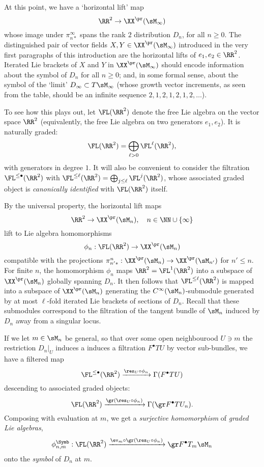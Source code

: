 \subsection{}
At this point, we have a `horizontal lift' map \[\RR^2 \to \XX^{\pr}(\sM_\infty)\]
whose image under $\pi^\infty_{n*}$ spans the rank $2$ distribution $D_n$,
for all $n \ge 0$. The distinguished pair of vector fields
$X, Y \in \XX^{\pr}(\sM_\infty)$ introduced in the very first paragraphs of this introduction 
are the horizontal lifts of
$e_1, e_2 \in \RR^2$. Iterated Lie brackets of $X$ and $Y$ in $\XX^{\pr}(\sM_\infty)$
should encode information about the symbol of $D_n$ for all $n\ge0$; and, in some formal sense,
about the symbol of the `limit' $D_\infty \subset T\sM_\infty$ (whose growth vector increments,
as seen from the table, should be an infinite sequence $2,1,2,1,2,1,2,\dots$).

To see how this plays out, let $\FL(\RR^2)$ denote the free Lie algebra on the vector space
$\RR^2$ (equivalently, the free Lie algebra on two generators $e_1,e_2$). 
It is naturally graded: \[ \FL(\RR^2) = \bigoplus_{\ell>0} \FL^\ell(\RR^2), \] 
with generators in degree $1$. It will also be convenient to consider the filtration
$\FL^{\le\bullet}(\RR^2)$ with $\FL^{\le\ell}(\RR^2) = \bigoplus_{j\le \ell} \FL^j(\RR^2)$,
whose associated graded object is \emph{canonically identified} with $\FL(\RR^2)$ itself.

By the universal property, the horizontal lift maps
\[ \RR^2 \to \XX^{\pr}(\sM_n),\quad n \in \NN \cup \{\infty\} \]
lift to Lie algebra homomorphisms
\[ \phi_n : \FL(\RR^2) \to \XX^{\pr}(\sM_n) \]
compatible with the projections $\pi^n_{n'*} : \XX^{\pr}(\sM_n) \to \XX^{\pr}(\sM_{n'})$ for $n'\le n$.
For finite $n$, the homomorphism $\phi_n$ maps $\RR^2 = \FL^1(\RR^2)$
into a subspace of $\XX^{\pr}(\sM_n)$ globally spanning $D_n$. It then follows that
$\FL^{\le\ell}(\RR^2)$
is mapped into a subspace of $\XX^{\pr}(\sM_n)$
generating the $C^\infty(\sM_n)$-submodule generated by at most $\ell$-fold iterated Lie brackets of sections of $D_n$.
Recall that these submodules correspond to the filtration of the tangent bundle of $\sM_n$
induced by $D_n$ away from a singular locus.

If we let $m \in \sM_n$ be general, so that over some open neighbourood $U \ni m$
the restriction $D_n|_U$ induces a 
induces a filtration $F^\bullet TU$ by vector sub-bundles, we have a filtered map
\[ \FL^{\le\bullet}(\RR^2) \xrightarrow{\res_U \circ \phi_n} \Gamma(F^\bullet TU) \]
descending to  associated graded objects:
\[ 
\FL(\RR^2) 
\xrightarrow{\gr(\res_U\circ \phi_n)}
\Gamma(\gr F^\bullet TU_n). 
\]
Composing with evaluation at $m$, we get a \emph{surjective homomorphism}
of \emph{graded Lie algebras},
\[ 
        \phi^{\Symb}_{n,m} : \FL(\RR^2) 
\xrightarrow{\ev_m \circ \gr(\res_U\circ\phi_n)}
\gr F^\bullet T_m\sM_n 
\]
onto the \emph{symbol} of $D_n$ at $m$.

